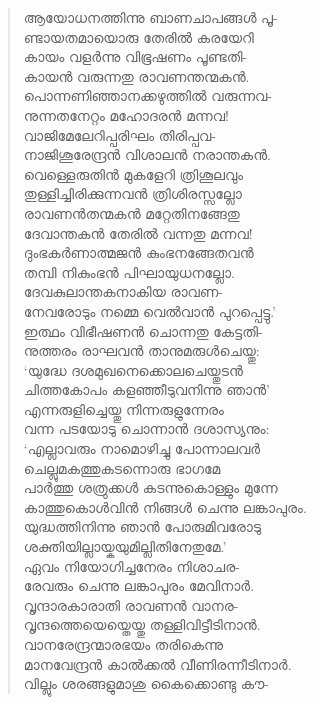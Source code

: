 \begin{verse}
ആയോധനത്തിന്നു ബാണചാപങ്ങള്‍ പൂ-\\
ണ്ടായതമായൊരു തേരില്‍ കരയേറി\\
കായം വളര്‍ന്നു വിഭൂഷണം പൂണ്ടതി-\\
കായന്‍ വരുന്നതു രാവണന്തന്മകന്‍.\\
പൊന്നണിഞ്ഞാനക്കഴുത്തില്‍ വരുന്നവ-\\
നുന്നതനേറ്റം മഹോദരന്‍ മന്നവ!\\
വാജിമേലേറിപ്പരിഘം തിരിപ്പവ-\\
നാജിശൂരേന്ദ്രന്‍ വിശാലന്‍ നരാന്തകന്‍.\\
വെള്ളെരുതിന്‍ മുകളേറി ത്രിശൂലവും\\
തുള്ളിച്ചിരിക്കുന്നവന്‍ ത്രിശിരസ്സല്ലോ\\
രാവണന്‍തന്മകന്‍ മറ്റേതിനങ്ങേതു\\
ദേവാന്തകന്‍ തേരില്‍ വന്നതു മന്നവ!\\
ദുംഭകര്‍ണാത്മജന്‍ കുംഭനങ്ങേതവന്‍\\
തമ്പി നികുംഭന്‍ പിഘായുധനല്ലോ.\\
ദേവകുലാന്തകനാകിയ രാവണ-\\
നേവരോടും നമ്മെ വെല്‍വാന്‍ പുറപ്പെട്ടു.’\\
ഇത്ഥം വിഭീഷണന്‍ ചൊന്നതു കേട്ടതി-\\
നുത്തരം രാഘവന്‍ താനുമരുള്‍ചെയ്തു:\\
‘യുദ്ധേ ദശമുഖനെക്കൊലചെയ്തുടന്‍\\
ചിത്തകോപം കളഞ്ഞീടുവനിന്നു ഞാന്‍’\\
എന്നരുളിച്ചെയ്തു നിന്നരുളുന്നേരം\\
വന്ന പടയോടു ചൊന്നാന്‍ ദശാസ്യനും:\\
‘എല്ലാവരും നാമൊഴിച്ചു പോന്നാലവര്‍\\
ചെല്ലുമകത്തുകടന്നൊരു ഭാഗമേ\\
പാര്‍ത്തു ശത്രുക്കള്‍ കടന്നുകൊള്ളും മുന്നേ\\
കാത്തുകൊള്‍വിന്‍ നിങ്ങള്‍ ചെന്നു ലങ്കാപുരം.\\
യുദ്ധത്തിനിന്നു ഞാന്‍ പോരുമിവരോടു\\
ശക്തിയില്ലായ്കയുമില്ലിതിനേതുമേ.’\\
ഏവം നിയോഗിച്ചനേരം നിശാചര-\\
രേവരും ചെന്നു ലങ്കാപുരം മേവിനാര്‍.\\
വൃന്ദാരകാരാതി രാവണന്‍ വാനര-\\
വൃന്ദത്തെയെയ്തെയ്തു തള്ളിവിട്ടീടിനാന്‍.\\
വാനരേന്ദ്രന്മാരഭയം തരികെന്നു\\
മാനവേന്ദ്രന്‍ കാല്‍ക്കല്‍ വീണിരന്നീടിനാര്‍.\\
വില്ലും ശരങ്ങളുമാശു കൈക്കൊണ്ടു കൗ-\\

\end{verse}
